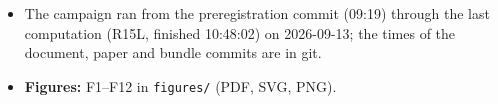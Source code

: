 \documentclass[10pt,a4paper]{article}
\begin{document}
\begin{itemize}
\item The campaign ran from the preregistration commit (09:19) through the last computation (R15L, finished 10:48:02) on 2026-09-13; the times of the document, paper and bundle commits are in git.
\item \textbf{Figures:} F1–F12 in \texttt{figures/\allowbreak{}} (PDF, SVG, PNG).
\end{itemize}
\end{document}
